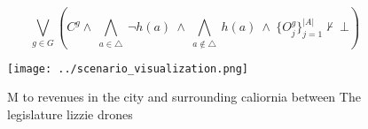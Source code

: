 \documentclass[a4paper]{article}
\begin{document}
\[\bigvee_{g\in G} (C^g \wedge\ \bigwedge_{a\in \triangle}\ \neg h(a)\ \wedge\ \bigwedge_{a\notin \triangle}\ h(a)\ \wedge\ \{O_j^g\}_{j=1}^{|A|} \nvdash\ \bot )\]

\begin{figure}
\centering
\texttt{[image: ../scenario\_visualization.png]}
\caption{M to revenues in the city and surrounding caliornia between The legislature lizzie drones
}
\end{figure}
 
\end{document}
